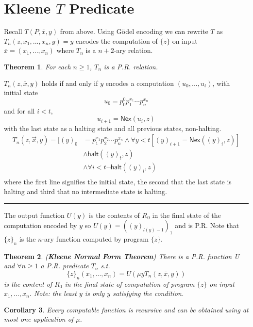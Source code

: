 \documentclass[twoside]{article}
\newcounter{lecnum}
\newtheorem{theorem}{Theorem}[lecnum]
\newtheorem{corollary}[theorem]{Corollary}
\newenvironment{proof}{{\bf Proof:}}{\hfill\rule{2mm}{2mm}}
\def\Nex{\mathsf{Nex}}
\def\halt{\mathsf{halt}}
\begin{document}
\section{Kleene $T$ Predicate}
Recall $T(P,\bar{x},y)$ from above. Using G\"{o}del encoding we can rewrite $T$ as $T_n(z, x_1, ..., x_n, y) = y$ encodes the computation of $\{z\}$ on input $\bar{x} = (x_1, ..., x_n)$ where $T_{n}$ is a $n+2$-ary relation. 

\begin{theorem}
For each $n \geq 1$, $T_n$ is a P.R. relation.
\end{theorem}
\begin{proof}
$T_n(z, \bar{x}, y)$ holds if and only if $y$ encodes a computation $(u_0, ..., u_t)$, with initial state
\[u_0 = p_0^0p_1^{x_1} \cdots p_n^{x_n}\]
and for all $i < t$,
\[u_{i+1} = \Nex (u_i, z)\]
with the last state as a halting state and all previous states, non-halting. 
\begin{align*}
T_n(z, \vec{x}, y) = [(y)_0 &= p_1^{x_1}p_2^{x_2} \cdots p_n^{x_n} \land \forall y < t[(y)_{i+1} = \Nex ((y)_i, z) ] \\
&\land \halt((y)_t, z) \\
&\land \forall i < t \lnot \halt((y)_i, z)\\ 
\end{align*}
where the first line signifies the initial state, the second that the last state is halting and third that no intermediate state is halting.
\end{proof}

The output function $U(y)$ is the contents of $R_0$ in the final state of the computation encoded by $y$ so $U(y) = ((y)_{l(y) - 1})_1$ and is P.R. Note that $\{z\}_n$ is the $n$-ary function computed by program $\{z\}$. 

\begin{theorem}
(\textbf{Kleene Normal Form Theorem}) There is a P.R. function U and $\forall n \geq 1$ a P.R. predicate $T_n$ s.t. 
\[\{z\}_n (x_1, ..., x_n) = U(\mu y T_n(z, \bar{x}, y))\]
is the content of $R_0$ in the final state of computation of program $\{z\}$ on input $x_1, ..., x_n$. Note: the least $y$ is only $y$ satisfying the condition. 
\end{theorem}

\begin{corollary}
Every computable function is recursive and can be obtained using at most one application of $\mu$.
\end{corollary}
\end{document}
